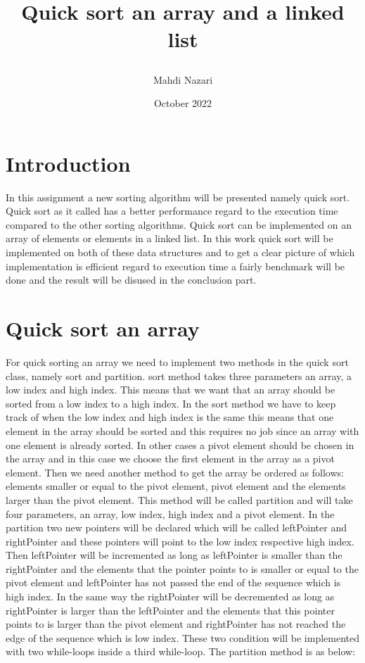 \documentclass[a4paper,11pt]{article}
\begin{document}
\title{
    \textbf{Quick sort an array and a linked list}
    
}
\author{Mahdi Nazari}
\date{October 2022}

\maketitle  
\section*{Introduction}
In this assignment a new sorting algorithm will be presented namely quick sort. Quick sort as it called has a better performance regard to the execution time compared to the other sorting algorithms. Quick sort can be implemented on an array of elements or elements in a linked list. In this work quick sort will be implemented on both of these data structures and to get a clear picture of which implementation is efficient regard to execution time a fairly benchmark will be done and the result will be disused in the conclusion part.  

\section*{Quick sort an array}
For quick sorting an array we need to implement two methods in the quick sort class, namely sort and partition. sort method takes three parameters an array, a low index and high index. This means that we want that an array should be sorted from a low index to a high index. In the sort method we have to keep track of when the low index and high index is the same this means that one element in the array should be sorted and this requires no job since an array with one element is already sorted. In other cases a pivot element should be chosen in the array and in this case we choose the first element in the array as a pivot element.\newline
Then we need another method to get the array be ordered as follows: elements smaller or equal to the pivot element, pivot element and the elements larger than the pivot element. This method will be called partition and will take four parameters, an array, low index, high index and a pivot element. In the partition two new pointers will be declared which will be called leftPointer and rightPointer and these pointers will point to the low index respective high index. Then leftPointer will be incremented as long as leftPointer is smaller than the rightPointer and the elements that the pointer points to is smaller or equal to the pivot element and leftPointer has not passed the end of the sequence which is high index. In the same way the rightPointer will be decremented as long as rightPointer is larger than the leftPointer and the elements that this pointer points to is larger than the pivot element and rightPointer has not reached the edge of the sequence which is low index. These two condition will be implemented with two while-loops inside a third while-loop. The partition method is as below:
\end{document}
